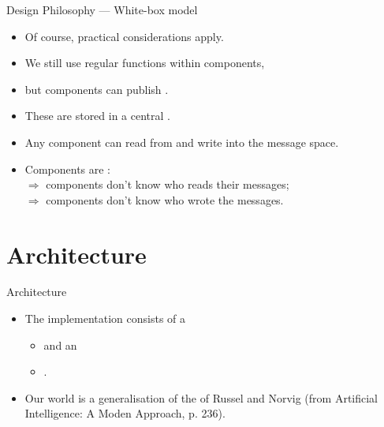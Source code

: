    \begin{frame}{Design Philosophy --- White-box model}
      \begin{itemize}
         \item Of course, practical considerations apply.
         \medskip
         \item We still use regular functions within components,
         \item but components can publish .
         \medskip
         \item These are stored in a central .
         \medskip
         \item Any component can read from and write into the message space.
         \vspace{8mm}
         \item Components are :\\
         $\Rightarrow$ components don't know who reads their messages;\\
         $\Rightarrow$ components don't know who wrote the messages.
      \end{itemize}
   \end{frame}
   
   \section{Architecture}
   
   \begin{frame}{Architecture}
      \begin{itemize}
         \item The implementation consists of a
         \begin{itemize}
            \item {} and an
            \item {}.
         \end{itemize}
         
         \medskip
         \item Our world is a generalisation of the  of Russel and Norvig (from Artificial Intelligence: A Moden Approach, p. 236).
      \end{itemize}
   \end{frame}
   
